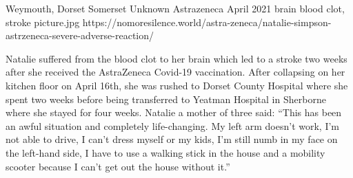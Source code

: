 {Weymouth, Dorset Somerset}
{Unknown}
{Astrazeneca}
{April 2021}
{brain blood clot, stroke}
{picture.jpg}
{https://nomoresilence.world/astra-zeneca/natalie-simpson-astrzeneca-severe-adverse-reaction/}
{


Natalie suffered from the blood clot to her brain which led to a stroke two
weeks after she received the AstraZeneca Covid-19 vaccination.
After collapsing on her kitchen floor on April 16th, she was rushed to Dorset
County Hospital where she spent two weeks before being transferred to Yeatman
Hospital in Sherborne where she stayed for four weeks.
Natalie a mother of three said: ``This has been an awful situation and
completely life-changing. My left arm doesn't work, I'm not able to
drive, I can't dress myself or my kids, I'm still numb in my face
on the left-hand side, I have to use a walking stick in the house and a
mobility scooter because I can't get out the house without it.''
}
